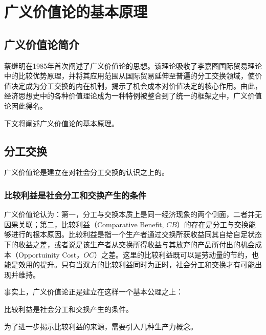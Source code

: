 
\chapter{广义价值论的基本原理}

\section{广义价值论简介}

蔡继明在1985年\cite{CaiJiMingBiJiaoLiYiShuoYuLaoDongJieZhiLun1985}首次阐述了广义价值论的思想。该理论吸收了李嘉图国际贸易理论中的比较优势原理，并将其应用范围从国际贸易延伸至普遍的分工交换领域，使价值决定成为分工交换的内在机制，揭示了机会成本对价值决定的核心作用。由此，经济思想史中的各种价值理论成为一种特例被整合到了统一的框架之中，广义价值论因此得名\cite[221]{LiRenJunJieZhiLiLun2004}。

下文将阐述广义价值论的基本原理。

\section{分工交换}

广义价值论是建立在对社会分工交换的认识之上的。

\subsection{比较利益是社会分工和交换产生的条件}

广义价值论认为：第一，分工与交换本质上是同一经济现象的两个侧面，二者并无因果关联；第二，比较利益（Comparative Benefit, $\mathit{CB}$）的存在是分工与交换能够进行的根本原因。比较利益是指一个生产者通过交换所获收益同其自给自足状态下的收益之差，或者说是该生产者从交换所得收益与其放弃的产品所付出的机会成本（Opportuinity Cost，$\mathit{OC}$）之差。这里的比较利益既可以是劳动量的节约，也能是效用的提升。只有当双方的比较利益同时为正时，社会分工和交换才有可能出现并维持\cite[32]{CaiJiMingLunFenGongYuJiaoHuanDeQiYuanHeJiaoHuanBiLiDeQueDingGuangYiJieZhiLunGangShang1999}。

事实上，广义价值论正是建立在这样一个基本公理之上：
\begin{axiom}
    \label{Bijiaoliyishishehuifengonghejiaohuanchanshengdetiaojian}
    比较利益是社会分工和交换产生的条件。
\end{axiom}

为了进一步揭示比较利益的来源，需要引入几种生产力概念。

